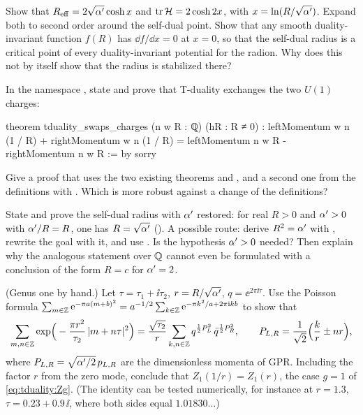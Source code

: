 \begin{exercise}[$\star\star$]
Show that $R_{\rm eff}=2\sqrt{\alpha'}\cosh x$ and $\operatorname{tr}\mathcal{H}=2\cosh2x$, with
$x=\ln(R/\sqrt{\alpha'})$. Expand both to second order around the self-dual point. Show that any
smooth duality-invariant function $f(R)$ has $\dd f/\dd x=0$ at $x=0$, so that the self-dual
radius is a critical point of every duality-invariant potential for the radion. Why does this
not by itself show that the radius is stabilized there?
\end{exercise}

\begin{exercise}
In the namespace , state and prove that T-duality
exchanges the two $U(1)$ charges:
\begin{leancode}
theorem tduality_swaps_charges (n w R : ℚ) (hR : R ≠ 0) :
    leftMomentum w n (1 / R) + rightMomentum w n (1 / R)
      = leftMomentum n w R - rightMomentum n w R := by
  sorry
\end{leancode}
Give a proof that uses the two existing theorems and , and a second one from the
definitions with . Which is more robust against a change of the definitions?
\end{exercise}

\begin{exercise}\label{ex:tduality:leansqrt}
State and prove the self-dual radius with $\alpha'$ restored:
for real $R>0$ and $\alpha'>0$ with $\alpha'/R=R$, one has $R=\sqrt{\alpha'}$ (). A possible
route: derive $R^2=\alpha'$ with , rewrite the goal with it, and use
. Is the hypothesis $\alpha'>0$ needed? Then explain why the analogous statement over $\mathbb{Q}$ cannot even be
formulated with a conclusion of the form $R=c$ for $\alpha'=2$.
\end{exercise}

\begin{exercise}[$\star\star\star$]
(Genus one by hand.) Let $\tau=\tau_1+\ii\tau_2$, $r=R/\sqrt{\alpha'}$, $q=\ee^{2\pi\ii\tau}$. Use the Poisson
formula $\sum_{m\in\mathbb{Z}}\mathrm{e}^{-\pi a(m+b)^2}=a^{-1/2}\sum_{k\in\mathbb{Z}}\mathrm{e}^{-\pi k^2/a+2\pi\mathrm{i} kb}$ to show that
\[
  \sum_{m,n\in\mathbb{Z}}\exp\!\Big(-\frac{\pi r^2}{\tau_2}\,|m+n\tau|^2\Big)
  =\frac{\sqrt{\tau_2}}{r}\sum_{k,n\in\mathbb{Z}}q^{\frac12P_L^2}\,\bar q^{\frac12P_R^2},\qquad
  P_{L,R}=\frac1{\sqrt2}\Big(\frac kr\pm nr\Big),
\]
where $P_{L,R}=\sqrt{\alpha'/2}\,p_{L,R}$ are the dimensionless momenta of GPR. Including the factor
$r$ from the zero mode, conclude that $Z_1(1/r)=Z_1(r)$, the case $g=1$ of \eqref{eq:tduality:Zg}.
(The identity can be tested numerically, for instance at $r=1.3$, $\tau=0.23+0.9\,\ii$, where both
sides equal $1.01830\ldots$)
\end{exercise}


